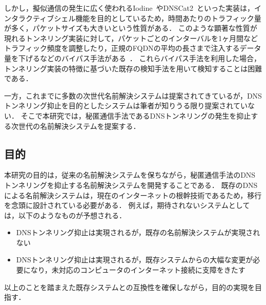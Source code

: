 しかし，擬似通信の発生に広く使われるIodine~\cite{iodine}やDNSCat2~\cite{dnscat2}といった実装は，インタラクティブシェル機能を目的としているため，時間あたりのトラフィック量が多く，パケットサイズも大きいという性質がある．
このような顕著な性質が現れるトンネリング実装に対して，パケットごとのインターバルを1ヶ月間などトラフィック頻度を調整したり，正規のFQDNの平均の長さまで注入するデータ量を下げるなどのバイパス手法がある~\cite{asaf}．
これらバイパス手法を利用した場合，トンネリング実装の特徴に基づいた既存の検知手法を用いて検知することは困難である．

一方，これまでに多数の次世代名前解決システムは提案されてきているが，DNSトンネリング抑止を目的としたシステムは筆者が知りうる限り提案されていない．
そこで本研究では，秘匿通信手法であるDNSトンネリングの発生を抑止する次世代の名前解決システムを提案する．


\subsection{目的}
本研究の目的は，従来の名前解決システムを保ちながら，秘匿通信手法のDNSトンネリングを抑止する名前解決システムを開発することである．
既存のDNSによる名前解決システムは，現在のインターネットの根幹技術であるため，移行を念頭に設計されている必要がある．
例えば，期待されないシステムとしては，以下のようなものが予想される．
\begin{itemize}
 \setlength{\itemsep}{-0.5mm}
 \item DNSトンネリング抑止は実現されるが，既存の名前解決システムが実現されない
 \item DNSトンネリング抑止は実現されるが，既存システムからの大幅な変更が必要になり，未対応のコンピュータのインターネット接続に支障をきたす
\end{itemize}
以上のことを踏まえた既存システムとの互換性を確保しながら，目的の実現を目指す．


